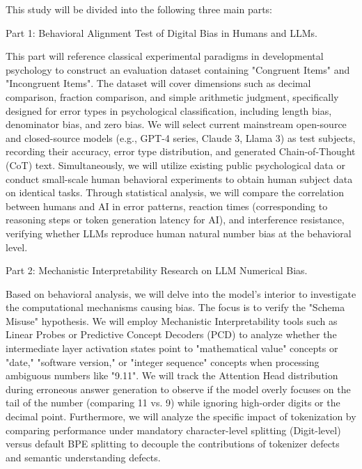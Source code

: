 This study will be divided into the following three main parts:

Part 1: Behavioral Alignment Test of Digital Bias in Humans and LLMs.

This part will reference classical experimental paradigms in developmental psychology to construct an evaluation dataset containing "Congruent Items" and "Incongruent Items". The dataset will cover dimensions such as decimal comparison, fraction comparison, and simple arithmetic judgment, specifically designed for error types in psychological classification, including length bias, denominator bias, and zero bias. We will select current mainstream open-source and closed-source models (e.g., GPT-4 series, Claude 3, Llama 3) as test subjects, recording their accuracy, error type distribution, and generated Chain-of-Thought (CoT) text. Simultaneously, we will utilize existing public psychological data or conduct small-scale human behavioral experiments to obtain human subject data on identical tasks. Through statistical analysis, we will compare the correlation between humans and AI in error patterns, reaction times (corresponding to reasoning steps or token generation latency for AI), and interference resistance, verifying whether LLMs reproduce human natural number bias at the behavioral level\cite{vamvakoussi2012}.

Part 2: Mechanistic Interpretability Research on LLM Numerical Bias.

Based on behavioral analysis, we will delve into the model's interior to investigate the computational mechanisms causing bias. The focus is to verify the "Schema Misuse" hypothesis. We will employ Mechanistic Interpretability tools such as Linear Probes or Predictive Concept Decoders (PCD) to analyze whether the intermediate layer activation states point to "mathematical value" concepts or "date," "software version," or "integer sequence" concepts when processing ambiguous numbers like "9.11". We will track the Attention Head distribution during erroneous answer generation to observe if the model overly focuses on the tail of the number (comparing 11 vs. 9) while ignoring high-order digits or the decimal point. Furthermore, we will analyze the specific impact of tokenization by comparing performance under mandatory character-level splitting (Digit-level) versus default BPE splitting to decouple the contributions of tokenizer defects and semantic understanding defects\cite{lieberum2024}.

